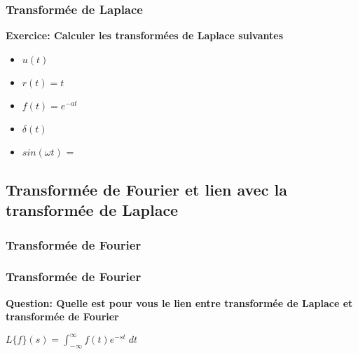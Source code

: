 \documentclass{beamer}
\begin{document}
\begin{frame} 
\frametitle{Transformée de Laplace}

\textbf{Exercice: Calculer les transformées de Laplace suivantes}\\
\vspace{1cm}
\begin{itemize}
\item $u(t)$   
\item $r(t) = t$   
\item $f(t) = e^{-at}$  
\item $\delta (t)$  
\item $sin(\omega t)$ = 
\end{itemize}

\end{frame}

\subsection{Transformée de Fourier et lien avec la transformée de Laplace}

\subsubsection{Transformée de Fourier}


\begin{frame}
\frametitle{Transformée de Fourier}
\textbf{Question: Quelle est pour vous le lien entre transformée de Laplace et transformée de Fourier}\\
\vspace{1 cm}
{
\begin{center}
	$L\{f\}(s) = \displaystyle \int^{\infty}_{-\infty} f(t) e^{-st} \; dt $ \only<3->{$ \rightarrow TF\{ f \}(\nu) = \displaystyle \int^{\infty}_{-\infty} f(t) e^{-j2\pi \nu t} dt $}
\end{center} 
}

\end{frame}
\end{document}
